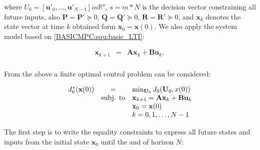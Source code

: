     where $U_0=[\textbf{u}'_0,\dots,\textbf{u}'_{N-1}]in\mathbb{R}^s$, $s=m*N$ is the decision vector constraining all future inputs, also $\textbf{P}=\textbf{P}'\succeq 0$, $\textbf{Q}=\textbf{Q}'\succeq 0$, $\textbf{R}=\textbf{R}'\succeq 0$, and $\textbf{x}_k$ denotes the state vector at time $k$ obtained form $\textbf{x}_0=\textbf{x}(0)$. We also apply the system model based on \ref{BASICMPC:equ:basic_LTI}:

    \begin{equation}
        \begin{array}{rcl}
            \textbf{x}_{k+1}&=&\textbf{Ax}_k+\textbf{Bu}_k,\\
        \end{array}
        \label{BASICMPC:equ:basic_horizon model}
    \end{equation}

   From the above a finite optimal control problem can be considered:

   \begin{equation}
        \begin{array}{rcl}
         J^*_0(\textbf{x}(0))&=&\min_{\textbf{U}_0}J_0(\textbf{U}_0,x(0))\\
         &\textnormal{subj. to}&\textbf{x}_{k+1}=\textbf{Ax}_k+\textbf{Bu}_k\\
         &&\textbf{x}_0=\textbf{x}(0)\\
         &&k=0,1,\dots,N-1
        \end{array}
        \label{BASICMPC:equ:optimal_control_problem_Euclidian}
    \end{equation}


    The first step is to write the equality constraints to express all future states and inputs from the initial state $\textbf{x}_0$ until the and of horizon $N$:

